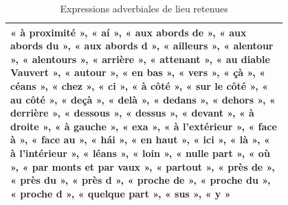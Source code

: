 \begin{table}[H]
\caption{Expressions adverbiales de lieu retenues}
\centering
\bigskip
\renewcommand{\arraystretch}{1.5} %
\begin{tabular}{|p{0.8\linewidth}|}
    \hline
    « à proximité », « aí », « aux abords de », « aux abords du », « aux abords d », « ailleurs », « alentour », « alentours », « arrière », « attenant », « au diable Vauvert », « autour », « en bas », « vers », « çà », « céans », « chez », « ci », « à côté », « sur le côté », « au côté », « deçà », « delà », « dedans », « dehors », « derrière », « dessous », « dessus », « devant », « à droite », « à gauche », « exa », « à l'extérieur », « face à », « face au », « hái », « en haut », « ici », « là », « à l'intérieur », « léans », « loin », « nulle part », « où », « par monts et par vaux », « partout », « près de », « près du », « près d », « proche de », « proche du », « proche d », « quelque part », « sus », « y »  \\
    \hline
\end{tabular}
 \label{Tab:adv_loca}
\end{table}

